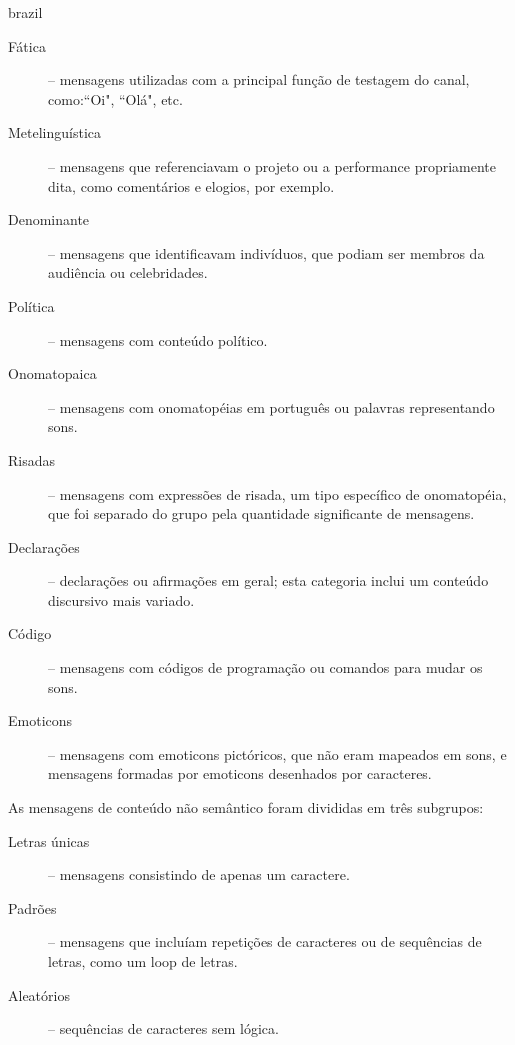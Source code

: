 \begin{otherlanguage*}{brazil}
\begin{description}
\item[Fática] -- mensagens utilizadas com a principal função de testagem do canal, como:``Oi", ``Olá", etc.
\item[Metelinguística] -- mensagens que referenciavam o projeto ou a performance propriamente dita, como comentários e elogios, por exemplo.
\item[Denominante] -- mensagens que identificavam indivíduos, que podiam ser membros da audiência ou celebridades.
\item[Política] -- mensagens com conteúdo político.
\item[Onomatopaica] -- mensagens com onomatopéias em português ou palavras representando sons.
\item[Risadas] -- mensagens com expressões de risada, um tipo específico de onomatopéia, que foi separado do grupo pela quantidade significante de mensagens. 
\item[Declarações] -- declarações ou afirmações em geral; esta categoria inclui um conteúdo discursivo mais variado.
\item[Código] -- mensagens com códigos de programação ou comandos para mudar os sons.
\item[Emoticons] -- mensagens com emoticons pictóricos, que não eram mapeados em sons, e mensagens formadas por emoticons desenhados por caracteres.
\end{description}

As mensagens de conteúdo não semântico foram divididas em três subgrupos:

\begin{description}
\item[Letras únicas] -- mensagens consistindo de apenas um caractere.
\item[Padrões] -- mensagens que incluíam repetições de caracteres ou de sequências de letras, como um loop de letras.
\item[Aleatórios] -- sequências de caracteres sem lógica.
\end{description}


\end{otherlanguage*}
